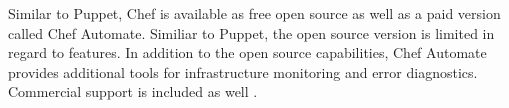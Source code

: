 Similar to Puppet, Chef is available as free open source as well as a paid version called Chef Automate. Similiar to Puppet, the open source version is limited in regard to features. In addition to the open source capabilities, Chef Automate provides additional tools for  infrastructure monitoring and error diagnostics. Commercial support is included as well \cite{chefiodatasheet}.

